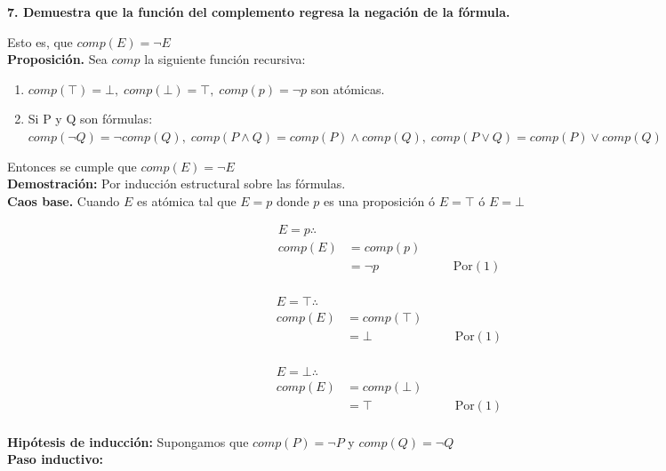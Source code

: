 \textbf{7. Demuestra que la función del complemento regresa la negación de la fórmula.}

Esto es, que $comp(E)=\neg E$\\
\textbf{Proposición.} Sea $comp$ la siguiente función recursiva:
\begin{enumerate}
	\item $comp(\top) = \bot,\;comp(\bot) = \top,\;comp(p) = \neg p$ son atómicas.
	\item Si P y Q son fórmulas: $comp(\neg Q) = \neg comp(Q),\;comp(P \land Q) = comp(P) \land comp(Q),\;comp(P \lor Q) = comp(P)\lor comp(Q)$
\end{enumerate}
\indent Entonces se cumple que $comp(E)=\neg E$
\noindent\\
\textbf{Demostración:} Por inducción estructural sobre las fórmulas.\\
\indent
\textbf{Caos base.} Cuando $E$ es atómica tal que $E=p$ donde $p$ es una proposición ó $E=\top$ ó $E=\bot$
\begin{multicols}{3}
	\begin{alignat*}{2}
		E=p\therefore                               \\
		comp(E) & = comp(p)                         \\
		        & =\neg p   & \quad & \text{Por}(1) \\
	\end{alignat*}

	\begin{alignat*}{2}
		E=\top\therefore                               \\
		comp(E) & = comp(\top)                         \\
		        & =\bot        & \quad & \text{Por}(1) \\
	\end{alignat*}

	\begin{alignat*}{2}
		E=\bot\therefore                               \\
		comp(E) & = comp(\bot)                         \\
		        & =\top        & \quad & \text{Por}(1) \\
	\end{alignat*}
\end{multicols}

\textbf{Hipótesis de inducción:} Supongamos que $comp(P)=\neg P$ y $comp(Q)=\neg Q$\\
\textbf{Paso inductivo:}